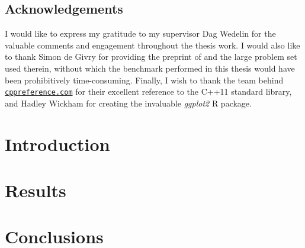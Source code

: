 \documentclass[paper=A4,DIV=calc]{scrbook}
\theoremstyle{plain}
\theoremstyle{definition}
\begin{document}
	\frontmatter
	\makefrontmatter[style=line]

	\cleardoublepage
	\section*{Acknowledgements}
	I would like to express my gratitude to my supervisor Dag Wedelin for the valuable comments and engagement throughout the thesis work.
	I would also like to thank Simon de Givry for providing the preprint of  \parencite{deGivry14} and the large problem set used therein, without which the benchmark performed in this thesis would have been prohibitively time-consuming.
	Finally, I wish to thank the team behind \href{http://en.cppreference.com/w/}{\nolinkurl{cppreference.com}} for their excellent reference to the C++11 standard library, and Hadley Wickham for creating the invaluable \textit{\textsf{ggplot2}} R package.

	\cleardoublepage
	\tableofcontents
	\cleardoublepage
	\printglossary[type=\acronymtype,]


	\mainmatter

	\chapter{Introduction}
	
	
	

	\glsresetall

	
	

	
	

	\chapter{Results}
	
	
	
	

	\chapter{Conclusions}
	

	\printbibliography[heading=bibintoc]
	\backmatter
\end{document}
